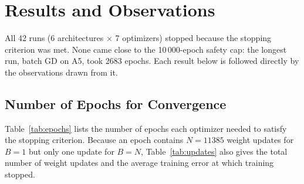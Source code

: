 \documentclass[runningheads]{llncs}
\begin{document}
\section{Results and Observations}
All 42 runs (6 architectures $\times$ 7 optimizers) stopped because the stopping criterion was met.
None came close to the 10\,000-epoch safety cap: the longest run, batch GD on A5, took 2683 epochs.
Each result below is followed directly by the observations drawn from it.

\subsection{Number of Epochs for Convergence}
Table~\ref{tab:epochs} lists the number of epochs each optimizer needed to satisfy the stopping
criterion. Because an epoch contains $N=11385$ weight updates for $B=1$ but only one update for
$B=N$, Table~\ref{tab:updates} also gives the total number of weight updates and the average
training error at which training stopped.

\begin{table}[!htb]
\centering
\caption{Number of epochs until $|E(t)-E(t-1)|<10^{-4}$ (BGD = batch gradient descent, GDR =
generalised delta rule). The fewest epochs for each architecture are shown in bold.}\label{tab:epochs}
\setlength{\tabcolsep}{7pt}

\end{table}

\begin{table}[!htb]
\centering
\caption{Average training error at the stopping epoch (top) and total number of weight updates
until stopping (bottom).}\label{tab:updates}
\setlength{\tabcolsep}{5.2pt}

\end{table}

\end{document}

